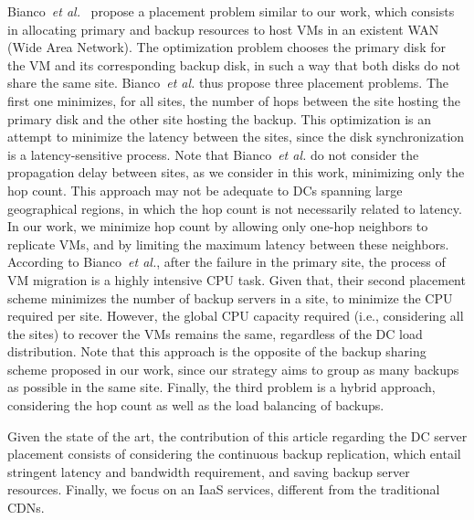 \documentclass[preprint]{elsarticle}
\begin{document}
Bianco~\textit{et al.}~\cite{bianco2010optimal} propose a placement problem similar to our work, which consists in allocating primary and backup resources to host VMs in an existent WAN (Wide Area Network).
The optimization problem chooses the primary disk for the VM and its corresponding backup disk, in such a way that both disks do not share the same site.
Bianco~\textit{et al.} thus propose three placement problems. The first one minimizes, for all sites, the number of hops between the site hosting the primary disk and the other site hosting the backup.
This optimization is an attempt to minimize the latency between the sites, since the disk synchronization is a latency-sensitive process. Note that Bianco~\textit{et al.} do not consider the propagation delay between sites, as we consider in this work, minimizing only the hop count. This approach may not be adequate to DCs spanning large geographical regions, in which the hop count is not necessarily related to latency.
In our work, we minimize hop count by allowing only one-hop neighbors to replicate VMs, and by limiting the maximum latency between these neighbors.
According to Bianco~\textit{et al.}, after the failure in the primary site, the process of VM migration is a highly intensive CPU task.
Given that, their second placement scheme minimizes the number of backup servers in a site, to minimize the CPU required per site. However, the global CPU capacity required (i.e., considering all the sites) to recover the VMs remains the same, regardless of the DC load distribution.
Note that this approach is the opposite of the backup sharing scheme proposed in our work, since our strategy aims to group as many backups as possible in the same site. Finally, the third problem is a hybrid approach, considering the hop count as well as the load balancing of backups.

Given the state of the art, the contribution of this article regarding the DC server placement consists of considering the continuous backup replication, which entail stringent latency and bandwidth requirement, and saving backup server resources.
Finally, we focus on an IaaS services, different from the traditional CDNs. 
\end{document}

